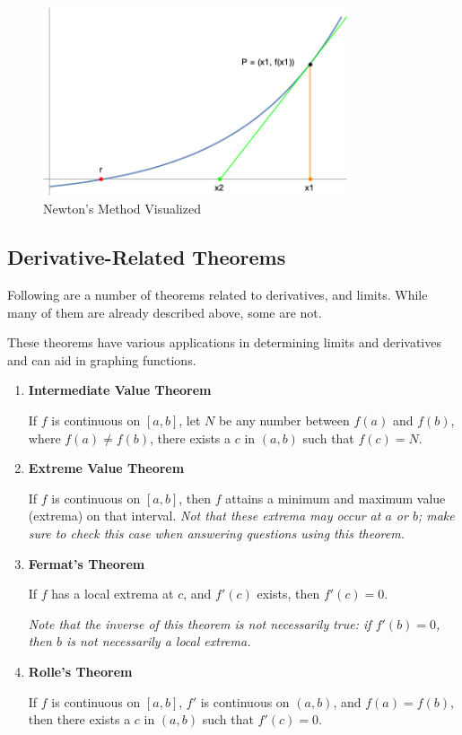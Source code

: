 \documentclass[12pt]{article}
\begin{document}
\begin{figure}[!ht]
    \centering
    \includegraphics[width=9cm]{misc/newtonsmethod.png}
    \caption{Newton's Method Visualized}
    \label{fig:newtonsmethod}
\end{figure}

\subsection{Derivative-Related Theorems}

Following are a number of theorems related to derivatives, and limits. While many of them are already described above, some are not.

These theorems have various applications in determining limits and derivatives and can aid in graphing functions.

\begin{enumerate}
    \item \textbf{Intermediate Value Theorem}
    
    If $f$ is continuous on $[a,b]$, let $N$ be any number between $f(a)$ and $f(b)$, where $f(a) \neq f(b)$, there exists a $c$ in $(a,b)$ such that $f(c) = N$.
    
    \item \textbf{Extreme Value Theorem}
    
    If $f$ is continuous on $[a,b]$, then $f$ attains a minimum and maximum value (extrema) on that interval. 
    \textit{Not that these extrema may occur at $a$ or $b$; make sure to check this case when answering questions using this theorem.}
    
    \item \textbf{Fermat's Theorem}
    
    If $f$ has a local extrema at $c$, and $f'(c)$ exists, then $f'(c) = 0$. 
    
    \textit{Note that the inverse of this theorem is not necessarily true: if $f'(b) = 0$, then $b$ is not necessarily a local extrema.}
    
    \item \textbf{Rolle's Theorem}
    
    If $f$ is continuous on $[a,b]$, $f'$ is continuous on $(a,b)$, and $f(a) = f(b)$, then there exists a $c$ in $(a,b)$ such that $f'(c) = 0$.
\end{enumerate}
\end{document}
